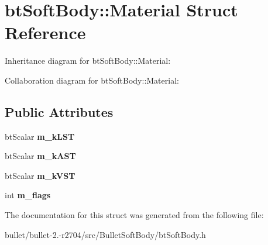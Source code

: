 \hypertarget{structbt_soft_body_1_1_material}{\section{bt\+Soft\+Body\+:\+:Material Struct Reference}
\label{structbt_soft_body_1_1_material}
}


Inheritance diagram for bt\+Soft\+Body\+:\+:Material\+:


Collaboration diagram for bt\+Soft\+Body\+:\+:Material\+:
\subsection*{Public Attributes}
\begin{DoxyCompactItemize}
\item 
\hypertarget{structbt_soft_body_1_1_material_adf4cb9a81ab3ce7fdb7297fb482fd9a8}{bt\+Scalar {\bfseries m\+\_\+k\+L\+S\+T}}\label{structbt_soft_body_1_1_material_adf4cb9a81ab3ce7fdb7297fb482fd9a8}

\item 
\hypertarget{structbt_soft_body_1_1_material_a1875797b002c5248c90f42fbee349a43}{bt\+Scalar {\bfseries m\+\_\+k\+A\+S\+T}}\label{structbt_soft_body_1_1_material_a1875797b002c5248c90f42fbee349a43}

\item 
\hypertarget{structbt_soft_body_1_1_material_ab86b682fc529ec4f315dbea2f87a7b29}{bt\+Scalar {\bfseries m\+\_\+k\+V\+S\+T}}\label{structbt_soft_body_1_1_material_ab86b682fc529ec4f315dbea2f87a7b29}

\item 
\hypertarget{structbt_soft_body_1_1_material_a1822a2a9a82241735e84531f59dc118c}{int {\bfseries m\+\_\+flags}}\label{structbt_soft_body_1_1_material_a1822a2a9a82241735e84531f59dc118c}

\end{DoxyCompactItemize}


The documentation for this struct was generated from the following file\+:\begin{DoxyCompactItemize}
\item 
bullet/bullet-\/2.-\/r2704/src/\+Bullet\+Soft\+Body/bt\+Soft\+Body.\+h\end{DoxyCompactItemize}
